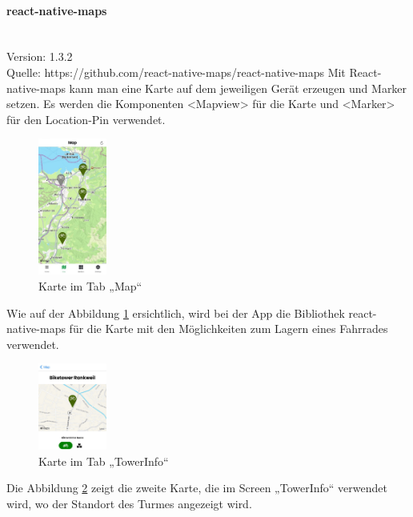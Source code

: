 \paragraph{react-native-maps}\mbox{}\\
Version: 1.3.2\\
Quelle: https://github.com/react-native-maps/react-native-maps
\bigskip
Mit React-native-maps kann man eine Karte auf dem jeweiligen Gerät erzeugen und Marker setzen. Es werden die Komponenten <Mapview> für die Karte und <Marker> für den \Gls{Location-Pin} verwendet.
\begin{figure}[H]
  \centering
  \includegraphics[width=0.2\textwidth]{images/app-screenshots/tabmap.jpg}
  \caption{Karte im Tab „Map“}
  \label{fig:tabmap}
\end{figure}
Wie auf der Abbildung \ref*{fig:tabmap} ersichtlich, wird bei der App die Bibliothek react-native-maps für die Karte mit den Möglichkeiten zum Lagern eines Fahrrades verwendet.
\begin{figure}[H]
  \centering
  \includegraphics[width=0.2\textwidth]{images/app-screenshots/smallmap.png}
  \caption{Karte im Tab „TowerInfo“}
  \label{fig:smallmap}
\end{figure}
Die Abbildung \ref{fig:smallmap} zeigt die zweite Karte, die im Screen „TowerInfo“ verwendet wird, wo der Standort des Turmes angezeigt wird.


